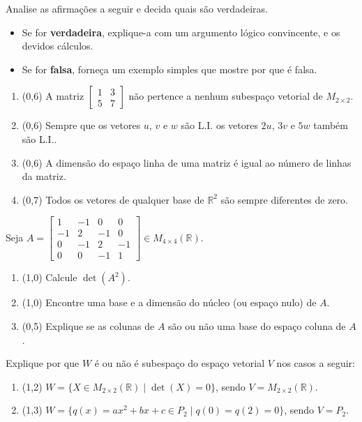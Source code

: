 \documentclass[12pt,a4paper]{article}
\newcommand{\fixme}{{\color{red}(...)}}
\newcommand*\R{\mathbb{R}}
\begin{document}
\begin{ExerciseList}
\Exercise[title={2,5}]
Analise as afirmações a seguir e decida quais são verdadeiras.
\begin{itemize}
\item Se for \textbf{verdadeira}, explique-a com um argumento lógico convincente, e os devidos cálculos.
\item Se for \textbf{falsa}, forneça um exemplo simples que mostre por que é falsa.
\end{itemize}
\begin{enumerate}
\item (0,6) A matriz $\begin{bmatrix}1 & 3 \\5 & 7 \end{bmatrix}$ não pertence a nenhum subespaço vetorial de $M_{2 \times 2}$.
\item (0,6) Sempre que os vetores $u$, $v$ e $w$ são L.I. os vetores $2u$, $3v$ e $5w$ também são L.I..
\item (0,6) A dimensão do espaço linha de uma matriz é igual ao número de linhas da matriz.
\item (0,7) Todos os vetores de qualquer base de $\R^2$ são sempre diferentes de zero.
\end{enumerate}
\Answer \fixme

\Exercise[title={2,5}] Seja $A = \begin{bmatrix}
 1 & -1 &  0 &  0 \\
-1 &  2 & -1 &  0 \\
 0 & -1 &  2 & -1 \\
 0 &  0 & -1 &  1
\end{bmatrix} \in M_{4\times 4}(\R)$.
\begin{enumerate}
\item (1,0) Calcule $\det(A^2)$.
\item (1,0) Encontre uma base e a dimensão do núcleo (ou espaço nulo) de $A$.
\item (0,5) Explique se as colunas de $A$ são ou não uma base do espaço coluna de $A$.
\end{enumerate}

\Answer  \fixme

\Exercise[title={2,5}]
Explique por que $W$ é ou não é subespaço do espaço vetorial $V$ nos casos a seguir:
\begin{enumerate}
\item (1,2) $W = \{ X \in M_{2 \times 2}(\R) \mid \det(X) = 0 \}$, sendo $V = M_{2 \times 2}(\R)$.
\item (1,3) $W = \{ q(x) = ax^2+bx+c \in P_2 \mid q( 0 ) = q(2) = 0 \}$, sendo $V = P_2$.
\end{enumerate}
\Answer \fixme


\end{ExerciseList}
\end{document}
